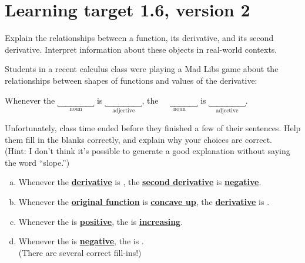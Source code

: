 \pagebreak

\section{Learning target 1.6, version 2}

Explain the relationships between a function, its derivative, and its second derivative. Interpret information about these objects in real-world contexts.

\hrulefill

Students in a recent calculus class were playing a Mad Libs game about the relationships between shapes of functions and values of the derivative:

\vspace{0.5em}
\begin{center}
    Whenever the 
    $\underbracket{\phantom{derivative}}_\text{noun}$ is
    $\underbracket{\phantom{derivative}}_\text{adjective}$,
    the 
    $\underbracket{\phantom{derivative}}_\text{noun}$ is
    $\underbracket{\phantom{derivative}}_\text{adjective}$.
\end{center}
\vspace{0.5em}

Unfortunately, class time ended before they finished a few of their sentences. Help them fill in the blanks correctly, and explain why your choices are correct. \\
(Hint: I don't think it's possible to generate a good explanation without saying the word ``slope.'')

\begin{enumerate}[(a)]
    \item Whenever the 
    \underline{\textbf{derivative}} is
    \underline{\phantom{decreasing}}, the
    \underline{\textbf{second derivative}} is
    \underline{\textbf{negative}}.
    \vfill

    \item Whenever the 
    \underline{\textbf{original function}} is
    \underline{\textbf{concave up}}, the
    \underline{\textbf{derivative}} is
    \underline{\phantom{increasing}}.
    \vfill

    \item Whenever the 
    \underline{\phantom{derivative}} is
    \underline{\textbf{positive}}, the
    \underline{\phantom{original function}} is
    \underline{\textbf{increasing}}.
    \vfill

    \item Whenever the 
    \underline{\phantom{derivative}} is
    \underline{\textbf{negative}}, the
    \underline{\phantom{second derivative}} is
    \underline{\phantom{positive}}. \\
    (There are several correct fill-ins!)
    \vfill

\end{enumerate}
\vspace{-3em}

